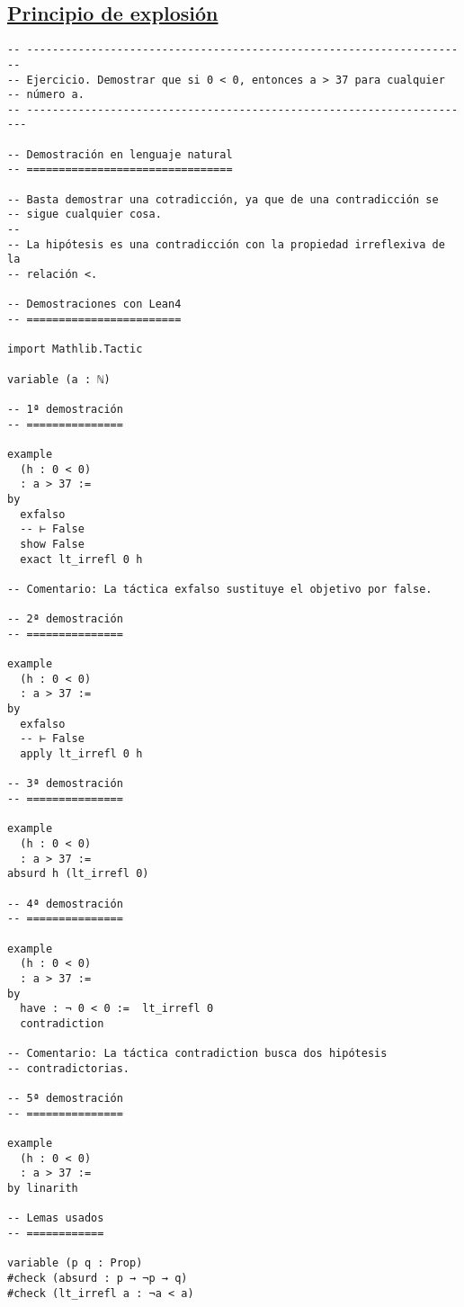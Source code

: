 \subsection{\href{./src/Logica/Principio\_de\_explosion.lean}{Principio de explosión}}
\label{sec:orgedab9e4}
\begin{verbatim}
-- ---------------------------------------------------------------------
-- Ejercicio. Demostrar que si 0 < 0, entonces a > 37 para cualquier
-- número a.
-- ----------------------------------------------------------------------

-- Demostración en lenguaje natural
-- ================================

-- Basta demostrar una cotradicción, ya que de una contradicción se
-- sigue cualquier cosa.
--
-- La hipótesis es una contradicción con la propiedad irreflexiva de la
-- relación <.

-- Demostraciones con Lean4
-- ========================

import Mathlib.Tactic

variable (a : ℕ)

-- 1ª demostración
-- ===============

example
  (h : 0 < 0)
  : a > 37 :=
by
  exfalso
  -- ⊢ False
  show False
  exact lt_irrefl 0 h

-- Comentario: La táctica exfalso sustituye el objetivo por false.

-- 2ª demostración
-- ===============

example
  (h : 0 < 0)
  : a > 37 :=
by
  exfalso
  -- ⊢ False
  apply lt_irrefl 0 h

-- 3ª demostración
-- ===============

example
  (h : 0 < 0)
  : a > 37 :=
absurd h (lt_irrefl 0)

-- 4ª demostración
-- ===============

example
  (h : 0 < 0)
  : a > 37 :=
by
  have : ¬ 0 < 0 :=  lt_irrefl 0
  contradiction

-- Comentario: La táctica contradiction busca dos hipótesis
-- contradictorias.

-- 5ª demostración
-- ===============

example
  (h : 0 < 0)
  : a > 37 :=
by linarith

-- Lemas usados
-- ============

variable (p q : Prop)
#check (absurd : p → ¬p → q)
#check (lt_irrefl a : ¬a < a)
\end{verbatim}

